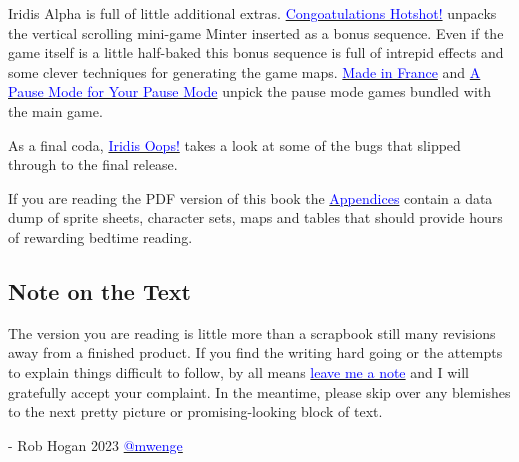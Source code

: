 Iridis Alpha is full of little additional extras. \hyperref[sec:bonus]{\textcolor{blue}{Congoatulations Hotshot!}} unpacks the vertical
scrolling mini-game Minter inserted as a bonus sequence. Even if the game itself is a little half-baked this bonus sequence is full of intrepid effects and some clever techniques
for generating the game maps. \hyperref[sec:mif]{\textcolor{blue}{Made in France}} and \hyperref[sec:dna]{\textcolor{blue}{A Pause Mode for Your Pause Mode}} unpick the pause mode games
bundled with the main game.

As a final coda, \hyperref[sec:bugs]{\textcolor{blue}{Iridis Oops!}} takes a look at some of the bugs that slipped through to the final release. 

If you are reading the PDF version of this book the \hyperref[sec:appendices]{\textcolor{blue}{Appendices}} contain a data dump of sprite sheets, character sets, maps and tables that 
should provide hours of rewarding bedtime reading.

\subsection{Note on the Text}
The version you are reading is little more than a scrapbook still many revisions away from a
finished product. If you find the writing hard going or the attempts to explain things difficult
to follow, by all means \href{https://github.com/mwenge/iatheory/issues}{\textcolor{blue}{leave me a note}} and
I will gratefully accept your complaint. In the meantime, please skip over any blemishes
to the next pretty picture or promising-looking block of text.


- Rob Hogan 2023 \href{https://mastodon.social/@mwenge}{\textcolor{blue}{@mwenge}}
